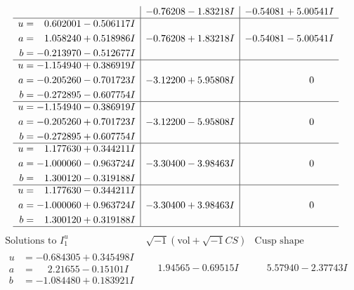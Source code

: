 \documentclass[1p]{elsarticle_modified}
\theoremstyle{definition}
\newcommand{\I}{\sqrt{-1}}
\begin{document}
$$\begin{array}{c|c|c}
 & -0.76208 - 1.83218 I & -0.54081 + 5.00541 I \\ \hline\begin{aligned}
u &= \phantom{-}0.602001 - 0.506117 I \\
a &= \phantom{-}1.058240 + 0.518986 I \\
b &= -0.213970 - 0.512677 I\end{aligned}
 & -0.76208 + 1.83218 I & -0.54081 - 5.00541 I \\ \hline\begin{aligned}
u &= -1.154940 + 0.386919 I \\
a &= -0.205260 - 0.701723 I \\
b &= -0.272895 - 0.607754 I\end{aligned}
 & -3.12200 + 5.95808 I & \phantom{-0.000000 } 0 \\ \hline\begin{aligned}
u &= -1.154940 - 0.386919 I \\
a &= -0.205260 + 0.701723 I \\
b &= -0.272895 + 0.607754 I\end{aligned}
 & -3.12200 - 5.95808 I & \phantom{-0.000000 } 0 \\ \hline\begin{aligned}
u &= \phantom{-}1.177630 + 0.344211 I \\
a &= -1.000060 - 0.963724 I \\
b &= \phantom{-}1.300120 - 0.319188 I\end{aligned}
 & -3.30400 - 3.98463 I & \phantom{-0.000000 } 0 \\ \hline\begin{aligned}
u &= \phantom{-}1.177630 - 0.344211 I \\
a &= -1.000060 + 0.963724 I \\
b &= \phantom{-}1.300120 + 0.319188 I\end{aligned}
 & -3.30400 + 3.98463 I & \phantom{-0.000000 } 0\\
 \hline 
 \end{array}$$\newpage$$\begin{array}{c|c|c}  
\text{Solutions to }I^u_{1}& \I (\text{vol} + \sqrt{-1}CS) & \text{Cusp shape}\\
 \hline 
\begin{aligned}
u &= -0.684305 + 0.345498 I \\
a &= \phantom{-}2.21655 - 0.15101 I \\
b &= -1.084480 + 0.183921 I\end{aligned}
 & \phantom{-}1.94565 - 0.69515 I & \phantom{-}5.57940 - 2.37743 I \\ \hline\begin{aligned}

\end{aligned}
\end{array}$$
\end{document}
